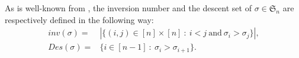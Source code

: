 \documentclass[a4paper,12pt]{article}
\begin{document}

As is well-known from \cite{stanley2011}, the inversion number and the descent set of $\sigma \in \mathfrak{S}_n$ are respectively defined in the following way:
\begin{align*}
inv (\sigma)=&| \{(i,j) \in [n] \times [n] ~:~ i<j~\textrm{and}~\sigma_i > \sigma _{j}\} |, \\
Des (\sigma)=&\{i \in [n-1] ~:~ \sigma_i > \sigma _{i+1}\}. 
\end{align*}
\end{document}
